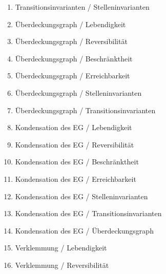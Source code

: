 \documentclass[10pt]{scrartcl}
\begin{document}
\begin{enumerate}
\item{Transitionsinvarianten / Stelleninvarianten}\\

\item{Überdeckungsgraph / Lebendigkeit}\\

\item{Überdeckungsgraph / Reversibilität}\\

\item{Überdeckungsgraph / Beschränktheit}\\

\item{Überdeckungsgraph / Erreichbarkeit}\\

\item{Überdeckungsgraph / Stelleninvarianten}\\

\item{Überdeckungsgraph / Transitionsinvarianten}\\

\item{Kondensation des EG / Lebendigkeit}\\

\item{Kondensation des EG  / Reversibilität}\\

\item{Kondensation des EG  / Beschränktheit}\\

\item{Kondensation des EG  / Erreichbarkeit}\\

\item{Kondensation des EG  / Stelleninvarianten}\\

\item{Kondensation des EG  / Transitionsinvarianten}\\

\item{Kondensation des EG  / Überdeckungsgraph}\\

\item{Verklemmung / Lebendigkeit}\\

\item{Verklemmung / Reversibilität}\\


\end{enumerate}
\end{document}

